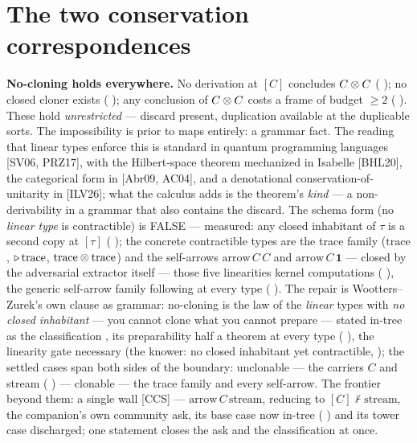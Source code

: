 \documentclass[11pt]{article}
\begin{document}
\section{The two conservation correspondences}

\textbf{No-cloning holds everywhere.} No derivation at $[C]$ concludes
$C\otimes C$ ( \meas{}); no closed cloner exists
( \meas{}); any conclusion of $C \otimes C$ costs a
frame of budget ${\ge}2$ ( \meas{}). These hold
\emph{unrestricted} --- discard present, duplication available at the
duplicable sorts. The impossibility is prior to maps entirely: a grammar
fact. \interp{} The reading that linear types enforce this is standard in
quantum programming languages [SV06, PRZ17], with the Hilbert-space theorem
mechanized in Isabelle [BHL20], the categorical form in [Abr09, AC04], and
a denotational conservation-of-unitarity in [ILV26]; what the calculus adds
is the theorem's \emph{kind} --- a non-derivability in a grammar that also
contains the discard. The schema form (no \emph{linear type} is contractible) is
FALSE --- measured: any closed inhabitant of $\tau$ is a second copy at
$[\tau]$ ( \meas{}); the concrete contractible
types are the trace family ($\mathrm{trace}$, $\triangleright\,\mathrm{trace}$,
$\mathrm{trace}\otimes\mathrm{trace}$) and the self-arrows
$\mathrm{arrow}\,C\,C$ and $\mathrm{arrow}\,C\,\mathbf{1}$ --- closed by the
adversarial extractor itself --- those five linearities kernel computations
( \meas{}), the generic self-arrow family following
at every type ( \meas{}). The repair is
Wootters--Zurek's own clause as
grammar: no-cloning is the law of the \emph{linear} types with \emph{no
closed inhabitant} --- you cannot clone what you cannot prepare ---
stated in-tree as the classification , its preparability half a
theorem at every type ( \meas{}), the linearity
gate necessary (the knower: no closed inhabitant yet contractible,
 \meas{}); the settled cases span both sides of the
boundary: unclonable --- the carriers $C$ and stream
( \meas{}) --- clonable --- the trace family and
every self-arrow. The frontier beyond them: a single wall [CCS] ---
$\mathrm{arrow}\,C\,\mathrm{stream}$, reducing to $[C] \nvdash
\mathrm{stream}$, the companion's own community ask, its base case now
in-tree ( \meas{}) and its tower case discharged;
one statement closes the ask and the classification at once.
\end{document}
